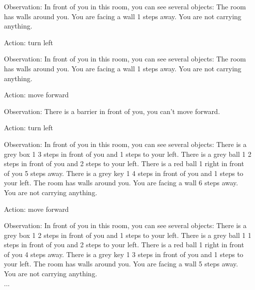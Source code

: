 \begin{tcolorbox}[breakable,title=Prompt Details for BabyAI ]
Observation: In front of you in this room, you can see several objects: The room has walls around you. You are facing a wall 1 steps away. You are not carrying anything.

Action: turn left

Observation: In front of you in this room, you can see several objects: The room has walls around you. You are facing a wall 1 steps away. You are not carrying anything.

Action: move forward

Observation: There is a barrier in front of you, you can't move forward.

Action: turn left

Observation: In front of you in this room, you can see several objects: There is a grey box 1 3 steps in front of you and 1 steps to your left.  There is a grey ball 1 2 steps in front of you and 2 steps to your left.  There is a red ball 1 right in front of you 5 steps away.  There is a grey key 1 4 steps in front of you and 1 steps to your left.  The room has walls around you. You are facing a wall 6 steps away. You are not carrying anything.

Action: move forward

Observation: In front of you in this room, you can see several objects: There is a grey box 1 2 steps in front of you and 1 steps to your left.  There is a grey ball 1 1 steps in front of you and 2 steps to your left.  There is a red ball 1 right in front of you 4 steps away.  There is a grey key 1 3 steps in front of you and 1 steps to your left.  The room has walls around you. You are facing a wall 5 steps away. You are not carrying anything. \\
...







\end{tcolorbox}
